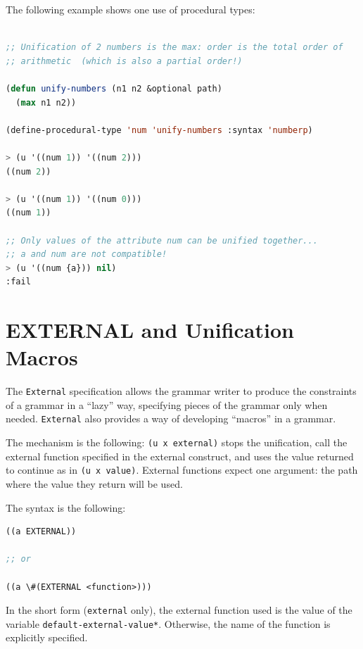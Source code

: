\documentclass[10pt,a4paper]{report}
\begin{document}
The following example shows one use of procedural types:

\begin{lstlisting}[language=Lisp]

;; Unification of 2 numbers is the max: order is the total order of
;; arithmetic  (which is also a partial order!)

(defun unify-numbers (n1 n2 &optional path)
  (max n1 n2))

(define-procedural-type 'num 'unify-numbers :syntax 'numberp)

> (u '((num 1)) '((num 2)))
((num 2))

> (u '((num 1)) '((num 0)))
((num 1))

;; Only values of the attribute num can be unified together...
;; a and num are not compatible!
> (u '((num {a})) nil)
:fail

\end{lstlisting}



\chapter{EXTERNAL and Unification Macros}

The {\tt External} specification allows the grammar writer to produce the
constraints of a grammar in a ``lazy'' way, specifying pieces of the
grammar only when needed.  {\tt External} also provides a way of developing
``macros'' in a grammar.

The mechanism is the following: {\tt (u x external)} stops the
unification, call the external function specified in the external
construct, and uses the value returned to continue as in {\tt (u x value)}.
External functions expect one argument: the path where the value they
return will be used.

The syntax is the following:

\begin{lstlisting}[language=Lisp]
((a EXTERNAL))

;; or 

((a \#(EXTERNAL <function>)))
\end{lstlisting}

In the short form ({\tt external} only), the external function used is the
value of the variable {\tt *default-external-value*}. Otherwise, the name of
the function is explicitly specified.
\end{document}
